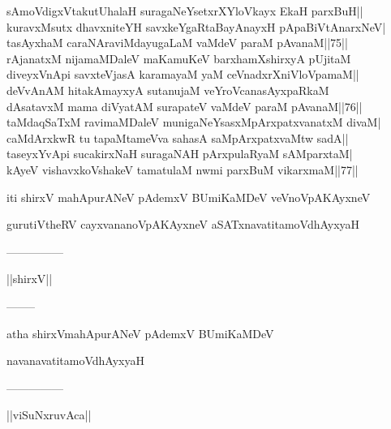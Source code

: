 \documentclass{article}
\begin{document}
sAmoVdigxVtakutUhalaH suragaNeYsetxrXYloVkayx EkaH parxBuH||\\
kuravxMsutx dhavxniteYH savxkeYgaRtaBayAnayxH pApaBiVtAnarxNeV|\\
tasAyxhaM caraNAraviMdayugaLaM vaMdeV paraM pAvanaM||75||\\
rAjanatxM nijamaMDaleV maKamuKeV barxhamXshirxyA pUjitaM\\
diveyxVnApi savxteVjasA karamayaM yaM ceVnadxrXniVloVpamaM||\\
deVvAnAM hitakAmayxyA sutanujaM veYroVcanasAyxpaRkaM\\
dAsatavxM mama diVyatAM surapateV vaMdeV paraM pAvanaM||76||\\
taMdaqSaTxM ravimaMDaleV munigaNeYsasxMpArxpatxvanatxM divaM|\\
caMdArxkwR tu tapaMtameVva sahasA saMpArxpatxvaMtw sadA||\\
taseyxYvApi sucakirxNaH suragaNAH pArxpulaRyaM sAMparxtaM|\\
kAyeV vishavxkoVshakeV tamatulaM nwmi parxBuM vikarxmaM||77||\\

\begin{center}
iti shirxV mahApurANeV pAdemxV BUmiKaMDeV veVnoVpAKAyxneV
\end{center}

\begin{center}
gurutiVtheRV cayxvananoVpAKAyxneV aSATxnavatitamoVdhAyxyaH
\end{center}

\begin{center}
---------------
\end{center}

\begin{center}
||shirxV||
\end{center}

\begin{center}
--------
\end{center}

\begin{center}
atha shirxVmahApurANeV pAdemxV BUmiKaMDeV
\end{center}

\begin{center}
navanavatitamoVdhAyxyaH
\end{center}

\begin{center}
---------------
\end{center}

\begin{center}
||viSuNxruvAca||
\end{center}
\end{document}
